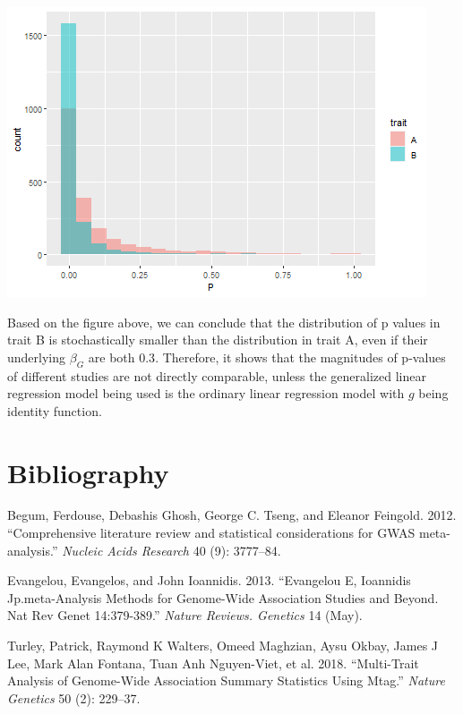 \documentclass[
]{article}
\begin{document}
\includegraphics{GWAS-Pvalues_files/figure-latex/visualization-1.png}

Based on the figure above, we can conclude that the distribution of p
values in trait B is stochastically smaller than the distribution in
trait A, even if their underlying \(\beta_G\) are both \(0.3\).
Therefore, it shows that the magnitudes of p-values of different studies
are not directly comparable, unless the generalized linear regression
model being used is the ordinary linear regression model with \(g\)
being identity function.

\clearpage

\hypertarget{bibliography}{%
\section{Bibliography}\label{bibliography}}

\setlength{\parindent}{-0.2in}
\setlength{\leftskip}{0.2in}
\setlength{\parskip}{8pt}

\noindent

\hypertarget{refs}{}
\leavevmode\hypertarget{ref-meta1}{}%
Begum, Ferdouse, Debashis Ghosh, George C. Tseng, and Eleanor Feingold.
2012. ``Comprehensive literature review and statistical considerations
for GWAS meta-analysis.'' \emph{Nucleic Acids Research} 40 (9):
3777--84.

\leavevmode\hypertarget{ref-meta2}{}%
Evangelou, Evangelos, and John Ioannidis. 2013. ``Evangelou E, Ioannidis
Jp.meta-Analysis Methods for Genome-Wide Association Studies and Beyond.
Nat Rev Genet 14:379-389.'' \emph{Nature Reviews. Genetics} 14 (May).

\leavevmode\hypertarget{ref-MTAG}{}%
Turley, Patrick, Raymond K Walters, Omeed Maghzian, Aysu Okbay, James J
Lee, Mark Alan Fontana, Tuan Anh Nguyen-Viet, et al. 2018. ``Multi-Trait
Analysis of Genome-Wide Association Summary Statistics Using Mtag.''
\emph{Nature Genetics} 50 (2): 229--37.
\end{document}
